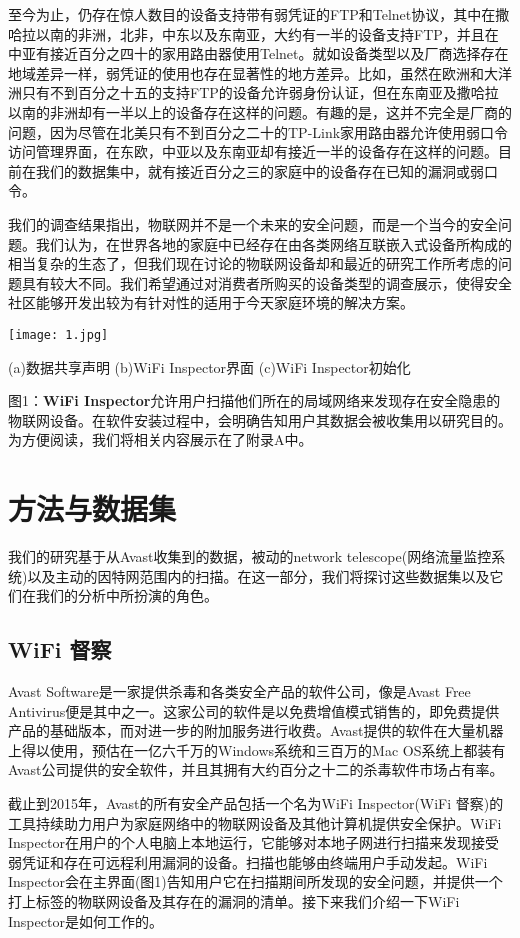 \documentclass[UTF8]{ctexart}
\begin{document}
	至今为止，仍存在惊人数目的设备支持带有弱凭证的FTP和Telnet协议，其中在撒哈拉以南的非洲，北非，中东以及东南亚，大约有一半的设备支持FTP，并且在中亚有接近百分之四十的家用路由器使用Telnet。就如设备类型以及厂商选择存在地域差异一样，弱凭证的使用也存在显著性的地方差异。比如，虽然在欧洲和大洋洲只有不到百分之十五的支持FTP的设备允许弱身份认证，但在东南亚及撒哈拉以南的非洲却有一半以上的设备存在这样的问题。有趣的是，这并不完全是厂商的问题，因为尽管在北美只有不到百分之二十的TP-Link家用路由器允许使用弱口令访问管理界面，在东欧，中亚以及东南亚却有接近一半的设备存在这样的问题。目前在我们的数据集中，就有接近百分之三的家庭中的设备存在已知的漏洞或弱口令。
	
	我们的调查结果指出，物联网并不是一个未来的安全问题，而是一个当今的安全问题。我们认为，在世界各地的家庭中已经存在由各类网络互联嵌入式设备所构成的相当复杂的生态了，但我们现在讨论的物联网设备却和最近的研究工作所考虑的问题具有较大不同。我们希望通过对消费者所购买的设备类型的调查展示，使得安全社区能够开发出较为有针对性的适用于今天家庭环境的解决方案。
	
	\texttt{[image: 1.jpg]}
	
	(a)数据共享声明 \quad (b)WiFi Inspector界面 (c)WiFi Inspector初始化
	
	图1：\textbf{WiFi Inspector}允许用户扫描他们所在的局域网络来发现存在安全隐患的物联网设备。在软件安装过程中，会明确告知用户其数据会被收集用以研究目的。为方便阅读，我们将相关内容展示在了附录A中。
	
	\section{方法与数据集}
	我们的研究基于从Avast收集到的数据，被动的network      telescope(网络流量监控系统)以及主动的因特网范围内的扫描。在这一部分，我们将探讨这些数据集以及它们在我们的分析中所扮演的角色。
	
	\subsection{WiFi 督察}
	Avast  Software是一家提供杀毒和各类安全产品的软件公司，像是Avast Free Antivirus便是其中之一。这家公司的软件是以免费增值模式销售的，即免费提供产品的基础版本，而对进一步的附加服务进行收费。Avast提供的软件在大量机器上得以使用，预估在一亿六千万的Windows系统和三百万的Mac     OS系统上都装有Avast公司提供的安全软件，并且其拥有大约百分之十二的杀毒软件市场占有率。
	
	截止到2015年，Avast的所有安全产品包括一个名为WiFi Inspector(WiFi 督察)的工具持续助力用户为家庭网络中的物联网设备及其他计算机提供安全保护。WiFi Inspector在用户的个人电脑上本地运行，它能够对本地子网进行扫描来发现接受弱凭证和存在可远程利用漏洞的设备。扫描也能够由终端用户手动发起。WiFi Inspector会在主界面(图1)告知用户它在扫描期间所发现的安全问题，并提供一个打上标签的物联网设备及其存在的漏洞的清单。接下来我们介绍一下WiFi Inspector是如何工作的。
	
\end{document}
